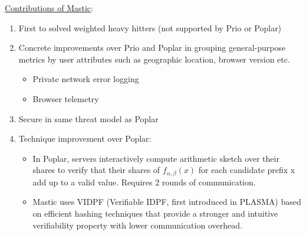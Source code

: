 \underline{Contributions of Mastic}:
\begin{enumerate}
   \item First to solved weighted heavy hitters (not supported by Prio or Poplar)
   \item Concrete improvements over Prio and Poplar in grouping general-purpose metrics by user attributes such as geographic location, browser version etc.
    \begin{itemize}
        \item Private network error logging
        \item Browser telemetry
    \end{itemize}
    \item Secure in same threat model as Poplar
    \item Technique improvement over Poplar:
    \begin{itemize}
        \item In Poplar, servers interactively compute arithmetic sketch over their shares to verify that their shares of $f_{\alpha, \beta}(x)$ for each candidate prefix x add up to a valid value. Requires 2 rounds of communication.
        \item Mastic uses VIDPF (Verifiable IDPF, first introduced in PLASMA) based on efficient hashing techniques that provide a stronger and intuitive verifiability property with lower communication overhead.
    \end{itemize}
\end{enumerate}





%
